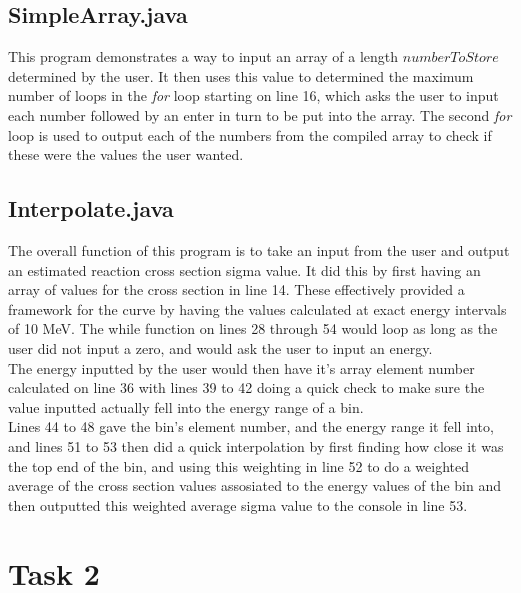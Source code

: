 \documentclass{article}
\begin{document}
\begin{multicols}{2}
		\subsection{SimpleArray.java}
			This program demonstrates a way to input an array of a length $numberToStore$ determined by the user. It then uses this value to determined the maximum number of loops in the \textit{for} loop starting on line 16, which asks the user to input each number followed by an enter in turn to be put into the array. The second \textit{for} loop is used to output each of the numbers from the compiled array to check if these were the values the user wanted.
		\subsection{Interpolate.java}
			The overall function of this program is to take an input from the user and output an estimated reaction cross section sigma value. It did this by first having an array of values for the cross section in line 14. These effectively provided a framework for the curve by having the values calculated at exact energy intervals of 10 MeV. The while function on lines 28 through 54 would loop as long as the user did not input a zero, and would ask the user to input an energy. \\ \indent The energy inputted by the user would then have it's array element number calculated on line 36 with lines 39 to 42 doing a quick check to make sure the value inputted actually fell into the energy range of a bin. \\ \indent Lines 44 to 48 gave the bin's element number, and the energy range it fell into, and lines 51 to 53 then did a quick interpolation by first finding how close it was the top end of the bin, and using this weighting in line 52 to do a weighted average of the cross section values assosiated to the energy values of the bin and then outputted this weighted average sigma value to the console in line 53.
	\section{Task 2}

\end{multicols}
\end{document}
